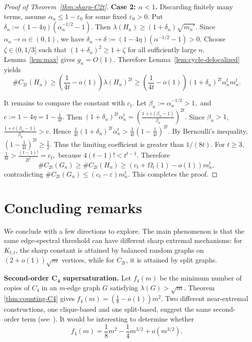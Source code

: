 \documentclass[11pt]{article}
\theoremstyle{definition}
\theoremstyle{plain}
\begin{document}
\begin{proof}[Proof of Theorem~\ref{thm:sharp-C2t}]
\smallskip
\noindent\textbf{Case 2: \(\alpha<1\).}
Discarding finitely many terms, assume
$\alpha_n\le 1-\varepsilon_0
$
for some fixed \(\varepsilon_0>0\).  Put
$        \delta_n:=(1-4\eta)(\alpha_n^{-1/2}-1).
$
Then
$        \lambda(H_n)\ge (1+\delta_n)\sqrt{m_n'}.$
Since \(\alpha_n\to\alpha\in(0,1)\), we have
$        \delta_n\to\delta:=(1-4\eta)(\alpha^{-1/2}-1)>0.
$
Choose \(\zeta\in(0,1/3]\) such that
$        (1+\delta_n)^2\ge 1+\zeta
$
for all sufficiently large \(n\).  Lemma~\ref{lem:max} gives
\(g_n=O(1)\).  Therefore Lemma~\ref{lem:cycle-delocalized} yields
\[
        \texttt{\#}C_{2t}(H_n)
        \ge
        \left(\frac{1}{4t}-o(1)\right)\lambda(H_n)^{2t} \ge
        \left(\frac{1}{4t}-o(1)\right)
        (1+\delta_n)^{2t}\alpha_n^t m_n^t.
\]

It remains to compare the constant with \(c_t\).  Let
$\beta_n:=\alpha_n^{-1/2}>1,$ and $
        c:=1-4\eta=1-\frac{1}{4t}.$
Then
$        (1+\delta_n)^{2t}\alpha_n^t
        =
        \left(\frac{1+c(\beta_n-1)}{\beta_n}\right)^{2t}.$
Since \(\beta_n>1\),
$        \frac{1+c(\beta_n-1)}{\beta_n}>c.
$
Hence
$        \frac{1}{4t}(1+\delta_n)^{2t}\alpha_n^t
        >
        \frac{1}{4t}\left(1-\frac{1}{4t}\right)^{2t}.$
By Bernoulli's inequality,
$        \left(1-\frac{1}{4t}\right)^{2t}\ge \frac12.
$
Thus the limiting coefficient is greater than \(1/(8t)\).  For
\(t\ge3\),
$        \frac{1}{8t}>\frac{(t-1)!}{2t^t}=c_t,
$
because \(4(t-1)!<t^{t-1}\).  Therefore
\[
        \texttt{\#}C_{2t}(G_n)
        \ge
        \texttt{\#}C_{2t}(H_n)
        \ge
        (c_t+\Omega_t(1)-o(1))m_n^t,
\]
contradicting
$        \texttt{\#}C_{2t}(G_n)\le (c_t-\varepsilon)m_n^t.
$
This completes the proof.
\end{proof}

\section{Concluding remarks}
\label{sec:Concluding}

We conclude with a few directions to explore.  The main phenomenon is that the same edge-spectral threshold
can have different sharp extremal mechanisms: for \(K_{t,t}\), the sharp
constant is attained by balanced random graphs on \((2+o(1))\sqrt m\)
vertices, while for \(C_{2t}\), it is attained by split graphs.

\smallskip
\noindent\textbf{Second-order \(\bm{C_4}\) supersaturation.}
Let \(f_4(m)\) be the minimum number of copies of \(C_4\) in an
\(m\)-edge graph \(G\) satisfying \(\lambda(G)>\sqrt m\).  Theorem
\ref{thm:counting-C4} gives $f_4(m)=\left(\frac18-o(1)\right)m^2.$
Two different near-extremal constructions, one clique-based and one
split-based, suggest the same second-order term (see~\cite{LiLiuZhang2025NosalBooksC4}).  It would be interesting
to determine whether
\[
        f_4(m)
        =
        \frac18m^2-\frac14m^{3/2}+o(m^{3/2}).
\]
\end{document}
